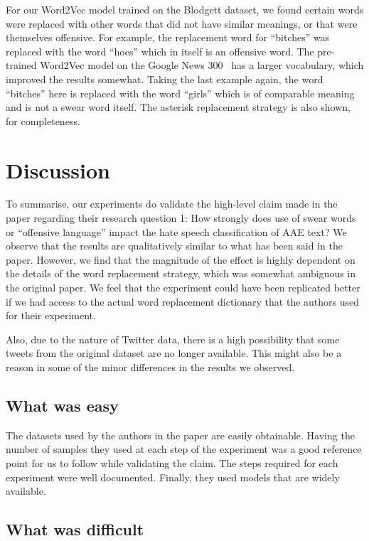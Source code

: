 For our Word2Vec model trained on the Blodgett dataset, we found certain words were replaced with other words that did not have similar meanings, or that were themselves offensive. For example, the replacement word for ``bitches'' was replaced with the word ``hoes'' which in itself is an offensive word. The pre-trained Word2Vec model on the Google News 300~\cite{rehurek2011gensim} has a larger vocabulary, which improved the results somewhat. Taking the last example again, the word ``bitches'' here is replaced with the word ``girls'' which is of comparable meaning and is not a swear word itself. The asterisk replacement strategy is also shown, for completeness.




\section{Discussion}
To summarise, our experiments do validate the high-level claim made in the paper\cite{aae_paper} regarding their research question 1: How strongly does use of swear words or ``offensive language'' impact the hate speech classification of AAE text? We observe that the results are qualitatively similar to what has been said in the paper. However, we find that the magnitude of the effect is highly dependent on the details of the word replacement strategy, which was somewhat ambiguous in the original paper. We feel that the experiment could have been replicated better if we had access to the actual word replacement dictionary that the authors used for their experiment. 

Also, due to the nature of Twitter data, there is a high possibility that some tweets from the original dataset are no longer available. This might also be a reason in some of the minor differences in the results we observed.

\subsection{What was easy}
The datasets used by the authors in the paper are easily obtainable. Having the number of samples they used at each step of the experiment was a good reference point for us to follow while validating the claim. The steps required for each experiment were well documented. Finally, they used models that are widely available.


\subsection{What was difficult}

